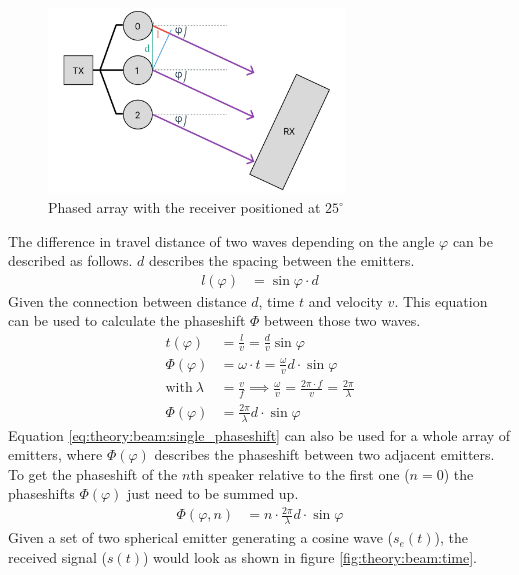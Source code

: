\begin{figure}
  \centering
  \includegraphics[width=0.7\textwidth]{src/assets/pictures/theory/angle_array.png}
  \caption{Phased array with the receiver positioned at $25^\circ$}\label{fig:theory:beam:array_angle}
\end{figure}
\p
The difference in travel distance of two waves depending on the angle \(\varphi\) can be described as follows. \(d\) describes the spacing between the emitters.
%
\begin{align}
  l(\varphi) &= \sin \varphi \cdot d
\end{align}
%
Given the connection between distance $d$, time $t$ and velocity $v$. This equation can be used to calculate the phaseshift $\Phi$ between those two waves.
%
\begin{align}
  t(\varphi)     &= \frac{l}{v} = \frac{d}{v} \sin \varphi \\[1em]
  \Phi(\varphi)  &= \omega \cdot t = \frac{\omega}{v} d \cdot \sin \varphi \\[1em]
  \mathrm{with~} \lambda &= \frac{v}{f} \implies \frac{\omega}{v} = \frac{2\pi \cdot f}{v} = \frac{2\pi}{\lambda} \\[1em]
  \Phi(\varphi)  &= \frac{2\pi}{\lambda} d \cdot \sin \varphi \label{eq:theory:beam:single_phaseshift}
\end{align}
%
Equation \ref{eq:theory:beam:single_phaseshift} can also be used for a whole array of emitters, where $\Phi(\varphi)$ describes the phaseshift between two adjacent emitters. To get the phaseshift of the $n$th speaker relative to the first one ($n=0$) the phaseshifts $\Phi(\varphi)$ just need to be summed up.
%
\begin{align}
  \Phi(\varphi, n) &= n \cdot \frac{2\pi}{\lambda} d \cdot \sin \varphi
\end{align}
%
Given a set of two spherical emitter generating a cosine wave (\(s_e(t)\)), the received signal (\(s(t)\)) would look as shown in figure \ref{fig:theory:beam:time}.
